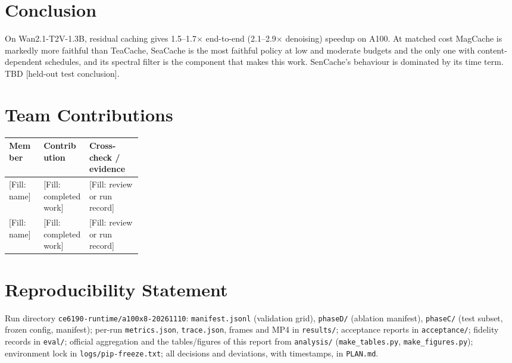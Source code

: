 \documentclass[11pt,a4paper]{article}
\newcommand{\pending}{\textcolor{draftorange}{\textsf{TBD}}}
\newcommand{\fillin}[1]{\textcolor{draftorange}{[\textsf{Fill: #1}]}}
\begin{document}
\section{Conclusion}
On Wan2.1-T2V-1.3B, residual caching gives 1.5--1.7$\times$ end-to-end (2.1--2.9$\times$ denoising) speedup on A100. At
matched cost MagCache is markedly more faithful than TeaCache, SeaCache is the most faithful policy at low and moderate
budgets and the only one with content-dependent schedules, and its spectral filter is the component that makes this work.
SenCache's behaviour is dominated by its time term. \pending{} [held-out test conclusion].

\section*{Team Contributions}
\begin{tabularx}{\linewidth}{@{}p{0.26\linewidth}YY@{}}\toprule
Member & Contribution & Cross-check / evidence\\\midrule
\fillin{name} & \fillin{completed work} & \fillin{review or run record}\\
\fillin{name} & \fillin{completed work} & \fillin{review or run record}\\\bottomrule
\end{tabularx}

\section*{Reproducibility Statement}
\sloppy
Run directory \texttt{ce6190-runtime/a100x8-20261110}: \texttt{manifest.jsonl} (validation grid), \texttt{phaseD/} (ablation
manifest), \texttt{phaseC/} (test subset, frozen config, manifest); per-run \texttt{metrics.json}, \texttt{trace.json},
frames and MP4 in \texttt{results/}; acceptance reports in \texttt{acceptance/}; fidelity records in \texttt{eval/}; official
aggregation and the tables/figures of this report from \texttt{analysis/} (\texttt{make\_tables.py},
\texttt{make\_figures.py}); environment lock in \texttt{logs/pip-freeze.txt}; all decisions and deviations, with
timestamps, in \texttt{PLAN.md}.



\end{document}
